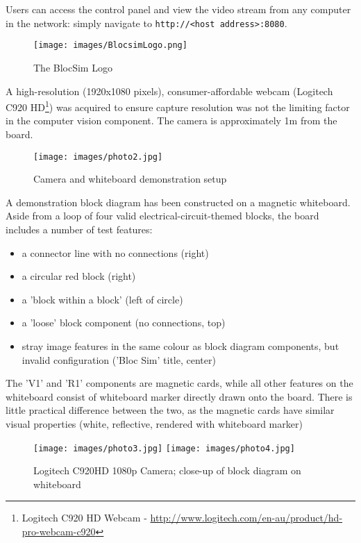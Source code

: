 Users can access the control panel and view the video stream from any computer in the network: simply navigate to \texttt{http://<host address>:8080}.

\begin{figure}[ht!]
\centering
\texttt{[image: images/BlocsimLogo.png]}
\caption{The BlocSim Logo \cite{blocsim}}
\label{im:blocsimlogo}
\end{figure}

\vspace{0.5 cm}

A high-resolution (1920x1080 pixels), consumer-affordable webcam (Logitech C920 HD\footnote{Logitech C920 HD Webcam - \url{http://www.logitech.com/en-au/product/hd-pro-webcam-c920}}) was acquired to ensure capture resolution was not the limiting factor in the computer vision component. The camera is approximately 1m from the board.

\begin{figure}[ht!]
\centering
\texttt{[image: images/photo2.jpg]}
\caption{Camera and whiteboard demonstration setup}
\label{im:hardware1}
\end{figure}

\clearpage

A demonstration block diagram has been constructed on a magnetic whiteboard. Aside from a loop of four valid electrical-circuit-themed blocks, the board includes a number of test features:
\begin{itemize}
\item a connector line with no connections (right)
\item a circular red block (right)
\item a 'block within a block' (left of circle)
\item a 'loose' block component (no connections, top)
\item stray image features in the same colour as block diagram components, but invalid configuration ('Bloc Sim' title, center)
\end{itemize}

The 'V1' and 'R1' components are magnetic cards, while all other features on the whiteboard consist of whiteboard marker directly drawn onto the board. There is little practical difference between the two, as the magnetic cards have similar visual properties (white, reflective, rendered with whiteboard marker)

\begin{figure}[ht!]
\centering
\texttt{[image: images/photo3.jpg]}
\texttt{[image: images/photo4.jpg]}
\caption{Logitech C920HD 1080p Camera; close-up of block diagram on whiteboard}
\label{im:hardware2}
\end{figure}


